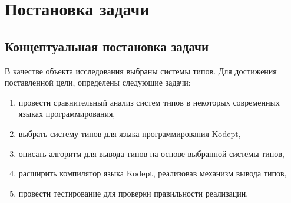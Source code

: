 \chapter{Постановка задачи}
\label{ch:task}


\section{Концептуальная постановка задачи}
\label{sec:abstract_task}

В качестве объекта исследования выбраны системы типов.
Для достижения поставленной цели, определены следующие задачи:

\begin{enumerate}
    \item провести сравнительный анализ систем типов в некоторых современных языках программирования,
    \item выбрать систему типов для языка программирования Kodept,
    \item описать алгоритм для вывода типов на основе выбранной системы типов,
    \item расширить компилятор языка Kodept, реализовав механизм вывода типов,
    \item провести тестирование для проверки правильности реализации.
\end{enumerate}

